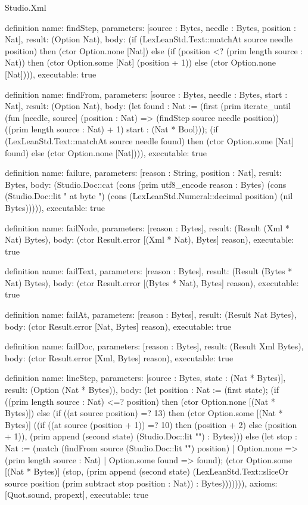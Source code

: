 \begin{lexlean}{Studio.Xml}
\begin{semanticmodule}
definition{
  name: findStep,
  parameters: [source : Bytes, needle : Bytes, position : Nat],
  result: (Option Nat),
  body: (if (LexLeanStd.Text::matchAt source needle position) then (ctor Option.none [Nat]) else (if (position <? (prim length source : Nat)) then (ctor Option.some [Nat] (position + 1)) else (ctor Option.none [Nat]))),
  executable: true
}

definition{
  name: findFrom,
  parameters: [source : Bytes, needle : Bytes, start : Nat],
  result: (Option Nat),
  body: (let found : Nat := (first (prim iterate_until (fun [needle, source] (position : Nat) => (findStep source needle position)) ((prim length source : Nat) + 1) start : (Nat * Bool))); (if (LexLeanStd.Text::matchAt source needle found) then (ctor Option.some [Nat] found) else (ctor Option.none [Nat]))),
  executable: true
}

definition{
  name: failure,
  parameters: [reason : String, position : Nat],
  result: Bytes,
  body: (Studio.Doc::cat (cons (prim utf8_encode reason : Bytes) (cons (Studio.Doc::lit " at byte ") (cons (LexLeanStd.Numeral::decimal position) (nil Bytes))))),
  executable: true
}

definition{
  name: failNode,
  parameters: [reason : Bytes],
  result: (Result (Xml * Nat) Bytes),
  body: (ctor Result.error [(Xml * Nat), Bytes] reason),
  executable: true
}

definition{
  name: failText,
  parameters: [reason : Bytes],
  result: (Result (Bytes * Nat) Bytes),
  body: (ctor Result.error [(Bytes * Nat), Bytes] reason),
  executable: true
}

definition{
  name: failAt,
  parameters: [reason : Bytes],
  result: (Result Nat Bytes),
  body: (ctor Result.error [Nat, Bytes] reason),
  executable: true
}

definition{
  name: failDoc,
  parameters: [reason : Bytes],
  result: (Result Xml Bytes),
  body: (ctor Result.error [Xml, Bytes] reason),
  executable: true
}

definition{
  name: lineStep,
  parameters: [source : Bytes, state : (Nat * Bytes)],
  result: (Option (Nat * Bytes)),
  body: (let position : Nat := (first state); (if ((prim length source : Nat) <=? position) then (ctor Option.none [(Nat * Bytes)]) else (if ((at source position) =? 13) then (ctor Option.some [(Nat * Bytes)] ((if ((at source (position + 1)) =? 10) then (position + 2) else (position + 1)), (prim append (second state) (Studio.Doc::lit "\n") : Bytes))) else (let stop : Nat := (match (findFrom source (Studio.Doc::lit "\r") position)
      | Option.none => (prim length source : Nat)
      | Option.some found => found); (ctor Option.some [(Nat * Bytes)] (stop, (prim append (second state) (LexLeanStd.Text::sliceOr source position (prim subtract stop position : Nat)) : Bytes))))))),
  axioms: [Quot.sound, propext],
  executable: true
}


\end{semanticmodule}
\end{lexlean}
